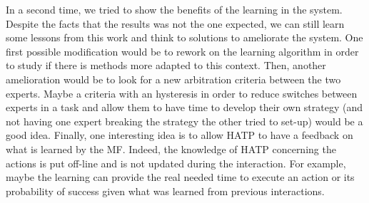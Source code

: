 \documentclass[english,a4paper,11pt,twoside]{StyleThese}
\begin{document}
In a second time, we tried to show the benefits of the learning in the system. Despite the facts that the results was not the one expected, we can still learn some lessons from this work and think to solutions to ameliorate the system. One first possible modification would be to rework on the learning algorithm in order to study if there is methods more adapted to this context. Then, another amelioration would be to look for a new arbitration criteria between the two experts. Maybe a criteria with an hysteresis in order to reduce switches between experts in a task and allow them to have time to develop their own strategy (and not having one expert breaking the strategy the other tried to set-up) would be a good idea. Finally, one interesting idea is to allow HATP to have a feedback on what is learned by the MF. Indeed, the knowledge of HATP concerning the actions is put off-line and is not updated during the interaction. For example, maybe the learning can provide the real needed time to execute an action or its probability of success given what was learned from previous interactions.


\ifdefined{}
\else


\end{document}

